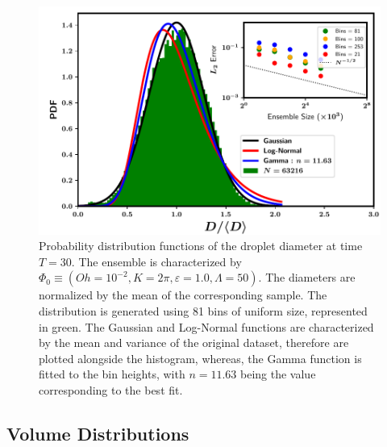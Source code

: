\begin{figure}
\centering
\includegraphics{plots/drop_stats/long_time_diameter_fits.pdf}
\caption{Probability distribution functions of the droplet diameter at time $T = 30$. 
The ensemble is characterized by $\Phi_0 \equiv \left( Oh = 10^{-2}, K = 2\pi , \varepsilon = 1.0 , \Lambda = 50 \right)$. 
The diameters are normalized by the mean of the corresponding sample.  
The distribution is generated using 81 bins of uniform size, represented in green.  
The Gaussian and Log-Normal functions are characterized by the mean and variance of the original dataset, 
therefore are plotted alongside the histogram, whereas, the Gamma function is fitted to the bin heights,
with $n= 11.63$ being the value corresponding to the best fit.
	}
\end{figure}



\subsection*{Volume Distributions}



